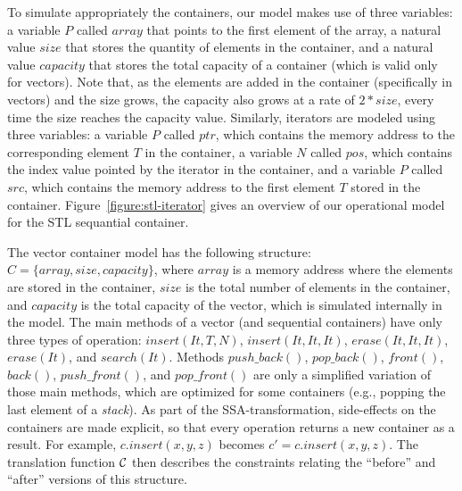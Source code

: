 \documentclass[a4paper]{llncs}
\begin{document}
To simulate appropriately the containers, our model makes
use of three variables: a variable $P$ called $array$ that points
to the first element of the array, a natural value $size$ that stores
the quantity of elements in the container, and a natural value $capacity$
that stores the total capacity of a container (which is valid only for vectors).
Note that, as the elements are added in the container (specifically in vectors)
and the size grows, the capacity also grows at a rate of $2*size$, every time
the size reaches the capacity value. Similarly, iterators are modeled using
three variables: a variable $P$ called $ptr$, which contains the memory address
to the corresponding element $T$ in the container, a variable $N$ called $pos$,
which contains the index value pointed by the iterator in the container, and a
variable $P$ called $src$, which contains the memory address to the first
element $T$ stored in the container. Figure~\ref{figure:stl-iterator} gives
an overview of our operational model for the STL sequantial container.
%
\begin{figure*}[ht] \centering
\caption{Operational model of the STL sequantial container.}
\label{figure:stl-iterator}
\end{figure*}

The vector container model has the following structure:
$C = \{ array, size, capacity\}$,
where $array$ is a memory address where the elements are stored in the container,
$size$ is the total number of elements in the container, and $capacity$
is the total capacity of the vector, which is simulated internally in the model.
The main methods of a vector (and sequential containers) have only
three types of operation: $\mathit{insert\left(It, T, N\right)}$,
$\mathit{insert\left(It, It, It\right)}$, $\mathit{erase\left(It, It, It\right)}$,
$\mathit{erase\left(It\right)}$, and $\mathit{search\left(It\right)}$.
Methods $push\_back\left(\right)$, $pop\_back\left(\right)$, $front\left(\right)$,
$back\left(\right)$, $push\_front\left(\right)$, and $pop\_front\left(\right)$ are only
a simplified variation of those main methods, which are optimized for some containers
(e.g., popping the last element of a \textit{stack}).
As part of the SSA-transformation, side-effects on the containers are made explicit,
so that every operation returns a new container as a result. For example,
$\mathit{c.insert\left(x,y,z\right)}$ becomes $\mathit{c' = c.insert\left(x,y,z\right)}$.
The translation function $\cal C$ then describes the constraints relating the ``before''
and ``after'' versions of this structure.
\end{document}
